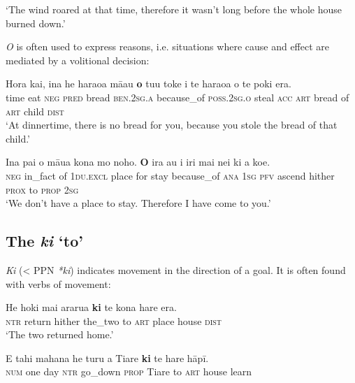 \glt
‘The wind roared at that time, therefore it wasn’t long before the whole house burned down.’ \textstyleExampleref{[R250.120]} 
\z

\textit{{\ꞌ}O} is often used to express reasons, i.e. situations where cause and effect are mediated by a volitional decision:

\ea\label{ex:4.254}
\gll Hora kai, {\ꞌ}ina he haraoa mā{\ꞌ}au \textbf{{\ꞌ}o} tu{\ꞌ}u toke i te haraoa  o te poki era.\\
time eat \textsc{neg} \textsc{pred} bread \textsc{ben.2sg.a} because\_of \textsc{poss.2sg.o} steal \textsc{acc} \textsc{art} bread  of \textsc{art} child \textsc{dist}\\

\glt 
‘At dinnertime, there is no bread for you, because you stole the bread of that child.’ \textstyleExampleref{[R245.048]} 
\z

\ea\label{ex:4.255}
\gll {\ꞌ}Ina pa{\ꞌ}i o māua kona mo noho. \textbf{{\ꞌ}O} ira au i iri   mai nei ki a koe.\\
\textsc{neg} in\_fact of \textsc{1du.excl} place for stay because\_of \textsc{ana} \textsc{1sg} \textsc{pfv} ascend   hither \textsc{prox} to \textsc{prop} \textsc{2sg}\\

\glt 
‘We don’t have a place to stay. Therefore I have come to you.’ \textstyleExampleref{[R229.210]}\textstyleExampleref{} 
\z
{}

\subsection{The  \textit{ki} ‘to’}\label{sec:4.7.3}

\textit{Ki} ({\textless} PPN \textit{*ki}) indicates movement in the direction of a goal. It is often found with verbs of movement:

\ea\label{ex:4.261}
\gll He hoki mai ararua \textbf{ki} te kona hare era. \\
\textsc{ntr} return hither the\_two to \textsc{art} place house \textsc{dist} \\

\glt 
‘The two returned home.’ \textstyleExampleref{[R166.007]} 
\z

\ea\label{ex:4.262}
\gll E tahi mahana he turu a Tiare \textbf{ki} te hare hāpī. \\
\textsc{num} one day \textsc{ntr} go\_down \textsc{prop} Tiare to \textsc{art} house learn \\

